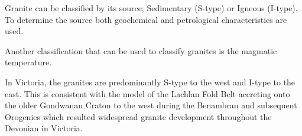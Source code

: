 \documentclass[a4paper]{article}
\begin{document}
Granite can be classified by its source; Sedimentary (S-type) or Igneous (I-type). To determine the source both geochemical and petrological characteristics are used.

Another classification that can be used to classify granites is the magmatic temperature.

In Victoria, the granites are predominantly S-type to the west and I-type to the east. This is consistent with the model of the Lachlan Fold Belt accreting onto the older Gondwanan Craton to the west during the Benambran and subsequent Orogenies which resulted widespread granite development throughout the Devonian in Victoria.
\newpage


\end{document}
